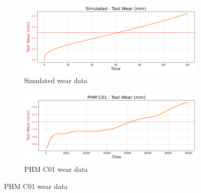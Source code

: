 \documentclass[a4paper, 12pt]{article}
\begin{document}
\begin{figure}[ht]
	\begin{subfigure}[b]{0.5\textwidth}
		\centering
		\includegraphics[width=\textwidth]{Simulated_wear_plot.png}  
		\caption{Simulated wear data}
		\label{fig:simulated}
	\end{subfigure}
	\hfill
	\begin{subfigure}[b]{0.5\textwidth}
		\centering
		\includegraphics[width=\textwidth]{PHM_C01_wear_plot.png}  
		\caption{PHM C01 wear data}
		\label{fig:C01}
	\end{subfigure} \par\bigskip
	

\end{figure}
\end{document}
